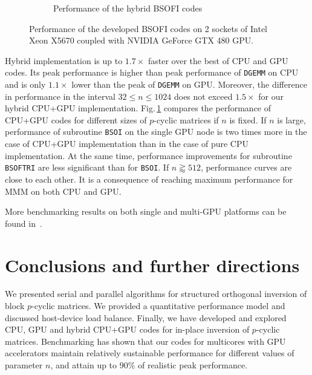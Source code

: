 \documentclass{llncs}
\newcommand{\Bsoftri}{\texttt{BSOFTRI}\xspace}
\newcommand{\Bsoi}{\texttt{BSOI}\xspace}
\newcommand{\Gemm}{\texttt{DGEMM}\xspace}
\begin{document}
\begin{figure}[t]
\begin{subfigure}[t]{0.49\linewidth}
    \caption{Performance of the hybrid BSOFI codes\label{fig:perf_hybrid_BSOFTRI_BSOI}}
  \end{subfigure}
  \caption{Performance of the developed BSOFI codes on 
    2 sockets of Intel Xeon X5670 
    coupled with NVIDIA GeForce GTX 480 GPU.} 
  \label{fig:performance_BSO}
\end{figure}
%
Hybrid implementation is up to $1.7\times$ faster over the 
best of CPU and GPU codes.
Its peak performance is higher than peak 
performance of \Gemm on CPU 
and is only $1.1\times$ lower than the peak of \Gemm on GPU.
Moreover, 
the difference in performance in the interval $32 \leq n \leq 1024$ 
does not exceed $1.5\times$ for our hybrid CPU+GPU implementation. %
%
Fig.\,\ref{fig:perf_hybrid_BSOFTRI_BSOI} %
compares 
the performance of CPU+GPU codes for different sizes of $p$-cyclic matrices if $n$ is fixed. 
If $n$ is large, performance of subroutine \Bsoi on the single GPU node 
is two times more in the case of CPU+GPU implementation  
than in the case of pure CPU implementation.
At the same time, 
performance improvements for subroutine \Bsoftri 
are less significant than for \Bsoi.
If $n \gtrapprox 512$, performance curves are close to each other. 
It is a consequence of reaching maximum performance for MMM
on both CPU and GPU. 

More benchmarking results on both single and multi-GPU platforms 
can be found in~\cite{GogolenkoBai13}.

\section{Conclusions and further directions}
\label{sec:conclusions}

We presented serial and parallel algorithms for structured orthogonal inversion
of block $p$-cyclic matrices. %
We provided a quantitative
performance model and discussed host-device load balance.
Finally, we have developed and explored CPU, GPU and hybrid CPU+GPU codes for 
in-place inversion of $p$-cyclic matrices. %
Benchmarking has shown that 
our codes for multicores with GPU accelerators
maintain relatively sustainable performance for different values 
of parameter $n$, and attain up to 90\% of realistic peak performance. 
\end{document}
